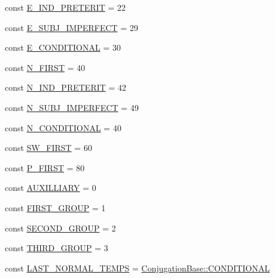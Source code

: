 \begin{DoxyCompactItemize}
const \hyperlink{class_conjugation_base_a5503d31ee48719d33098591810fc3f58}{E\+\_\+\+I\+N\+D\+\_\+\+P\+R\+E\+T\+E\+R\+IT} = 22
\item 
const \hyperlink{class_conjugation_base_afc268d8825396ff04f01d85deaf8c33f}{E\+\_\+\+S\+U\+B\+J\+\_\+\+I\+M\+P\+E\+R\+F\+E\+CT} = 29
\item 
const \hyperlink{class_conjugation_base_a9bc888695350391f4d6da8fc191679c4}{E\+\_\+\+C\+O\+N\+D\+I\+T\+I\+O\+N\+AL} = 30
\item 
const \hyperlink{class_conjugation_base_a109b61ea3f44b885131acc8cd2cc1041}{N\+\_\+\+F\+I\+R\+ST} = 40
\item 
const \hyperlink{class_conjugation_base_ace5ce9108e8d34a8111cd51dbe9c3598}{N\+\_\+\+I\+N\+D\+\_\+\+P\+R\+E\+T\+E\+R\+IT} = 42
\item 
const \hyperlink{class_conjugation_base_a4b0123c72fd74dfbfd3fa42d71bd7e39}{N\+\_\+\+S\+U\+B\+J\+\_\+\+I\+M\+P\+E\+R\+F\+E\+CT} = 49
\item 
const \hyperlink{class_conjugation_base_a66898e8176a1e2c5aacad8657b90df08}{N\+\_\+\+C\+O\+N\+D\+I\+T\+I\+O\+N\+AL} = 40
\item 
const \hyperlink{class_conjugation_base_aadfcc5e449ab900e86244bcfdd8add79}{S\+W\+\_\+\+F\+I\+R\+ST} = 60
\item 
const \hyperlink{class_conjugation_base_ac632d52e6076cf1bb490c82291d4c76f}{P\+\_\+\+F\+I\+R\+ST} = 80
\item 
const \hyperlink{class_conjugation_base_a997e57538ff7276bae361d1333f11d11}{A\+U\+X\+I\+L\+L\+I\+A\+RY} = 0
\item 
const \hyperlink{class_conjugation_base_a98dfd89993e82fd8bd1cc855dac980fc}{F\+I\+R\+S\+T\+\_\+\+G\+R\+O\+UP} = 1
\item 
const \hyperlink{class_conjugation_base_aed0c839ab301efe958079fac4bc96811}{S\+E\+C\+O\+N\+D\+\_\+\+G\+R\+O\+UP} = 2
\item 
const \hyperlink{class_conjugation_base_a15fb84852952c270f80139517000d263}{T\+H\+I\+R\+D\+\_\+\+G\+R\+O\+UP} = 3
\item 
const \hyperlink{class_conjugation_base_a611f1018ef9d7b1fb76ef25864bc09b9}{L\+A\+S\+T\+\_\+\+N\+O\+R\+M\+A\+L\+\_\+\+T\+E\+M\+PS} = \hyperlink{class_conjugation_base_aac0359d9a8bb66ea04612b7f14d43c50}{Conjugation\+Base\+::\+C\+O\+N\+D\+I\+T\+I\+O\+N\+AL}
\end{DoxyCompactItemize}
